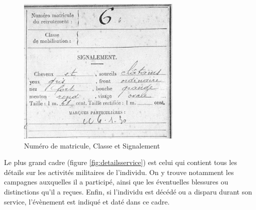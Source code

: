 \documentclass[a4paper]{article}
\begin{document}
\begin{figure}[H]
\centering
\includegraphics[width=0.7\textwidth]{Classe_Signalement_2.PNG}
\caption{\label{fig:classe_signalement}Num\'ero de matricule, Classe et Signalement}
\end{figure}

    Le plus grand cadre (figure \ref{fig:detailsservice}) est celui qui contient tous les d\'etails sur les activit\'es militaires de l'individu. On y trouve notamment les campagnes auxquelles il a particip\'e, ainsi que les \'eventuelles blessures ou distinctions qu'il a re\c{c}ues. Enfin, si l'individu est d\'ec\'ed\'e ou a disparu durant son service, l'\'ev\`enement est indiqu\'e et dat\'e dans ce cadre.
    
\end{document}
